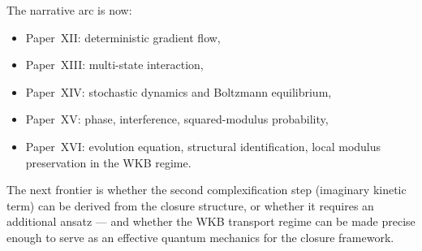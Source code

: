 \documentclass[12pt]{article}
\begin{document}
The narrative arc is now:
\begin{itemize}
    \item Paper~XII: deterministic gradient flow,
    \item Paper~XIII: multi-state interaction,
    \item Paper~XIV: stochastic dynamics and Boltzmann equilibrium,
    \item Paper~XV: phase, interference, squared-modulus probability,
    \item Paper~XVI: evolution equation, structural identification, local modulus preservation in the WKB regime.
\end{itemize}

The next frontier is whether the second complexification step (imaginary kinetic term) can be derived from the closure structure, or whether it requires an additional ansatz --- and whether the WKB transport regime can be made precise enough to serve as an effective quantum mechanics for the closure framework.



\end{document}
